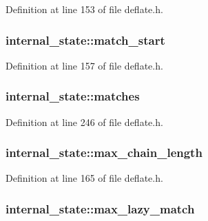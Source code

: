 Definition at line 153 of file deflate.\-h.

\hypertarget{structinternal__state_aced58a85c56daa1c5de41fa5ce75d2e8}{
\subsubsection[{match\-\_\-start}]{ internal\-\_\-state\-::match\-\_\-start}}\label{structinternal__state_aced58a85c56daa1c5de41fa5ce75d2e8}


Definition at line 157 of file deflate.\-h.

\hypertarget{structinternal__state_ac0f10ec7237615f6b632f2f4d14872ef}{
\subsubsection[{matches}]{ internal\-\_\-state\-::matches}}\label{structinternal__state_ac0f10ec7237615f6b632f2f4d14872ef}


Definition at line 246 of file deflate.\-h.

\hypertarget{structinternal__state_ab1ffa7feb159edec170574813fae3279}{
\subsubsection[{max\-\_\-chain\-\_\-length}]{ internal\-\_\-state\-::max\-\_\-chain\-\_\-length}}\label{structinternal__state_ab1ffa7feb159edec170574813fae3279}


Definition at line 165 of file deflate.\-h.

\hypertarget{structinternal__state_ab74215ec1c106bf588a7642927d47b84}{
\subsubsection[{max\-\_\-lazy\-\_\-match}]{ internal\-\_\-state\-::max\-\_\-lazy\-\_\-match}}\label{structinternal__state_ab74215ec1c106bf588a7642927d47b84}


